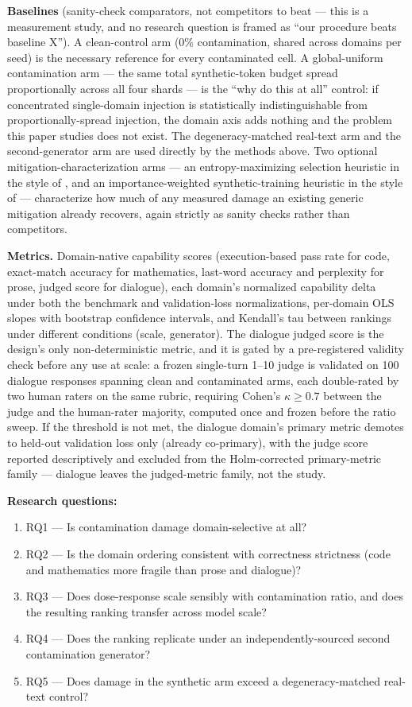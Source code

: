 \documentclass[11pt]{article}
\begin{document}
\textbf{Baselines} (sanity-check comparators, not competitors to beat --- this is a measurement study, and no research question is framed as ``our procedure beats baseline X''). A clean-control arm (0\% contamination, shared across domains per seed) is the necessary reference for every contaminated cell. A global-uniform contamination arm --- the same total synthetic-token budget spread proportionally across all four shards --- is the ``why do this at all'' control: if concentrated single-domain injection is statistically indistinguishable from proportionally-spread injection, the domain axis adds nothing and the problem this paper studies does not exist. The degeneracy-matched real-text arm and the second-generator arm are used directly by the methods above. Two optional mitigation-characterization arms --- an entropy-maximizing selection heuristic in the style of \citet{EntropyCollapse2023}, and an importance-weighted synthetic-training heuristic in the style of \citet{SynthWeighting2023} --- characterize how much of any measured damage an existing generic mitigation already recovers, again strictly as sanity checks rather than competitors.

\textbf{Metrics.} Domain-native capability scores (execution-based pass rate for code, exact-match accuracy for mathematics, last-word accuracy and perplexity for prose, judged score for dialogue), each domain's normalized capability delta under both the benchmark and validation-loss normalizations, per-domain OLS slopes with bootstrap confidence intervals, and Kendall's tau between rankings under different conditions (scale, generator). The dialogue judged score is the design's only non-deterministic metric, and it is gated by a pre-registered validity check before any use at scale: a frozen single-turn 1--10 judge is validated on 100 dialogue responses spanning clean and contaminated arms, each double-rated by two human raters on the same rubric, requiring Cohen's $\kappa \geq 0.7$ between the judge and the human-rater majority, computed once and frozen before the ratio sweep. If the threshold is not met, the dialogue domain's primary metric demotes to held-out validation loss only (already co-primary), with the judge score reported descriptively and excluded from the Holm-corrected primary-metric family --- dialogue leaves the judged-metric family, not the study.

\textbf{Research questions:}
\begin{enumerate}[leftmargin=1.6em]
\item RQ1 --- Is contamination damage domain-selective at all?
\item RQ2 --- Is the domain ordering consistent with correctness strictness (code and mathematics more fragile than prose and dialogue)?
\item RQ3 --- Does dose-response scale sensibly with contamination ratio, and does the resulting ranking transfer across model scale?
\item RQ4 --- Does the ranking replicate under an independently-sourced second contamination generator?
\item RQ5 --- Does damage in the synthetic arm exceed a degeneracy-matched real-text control?
\end{enumerate}
\end{document}
